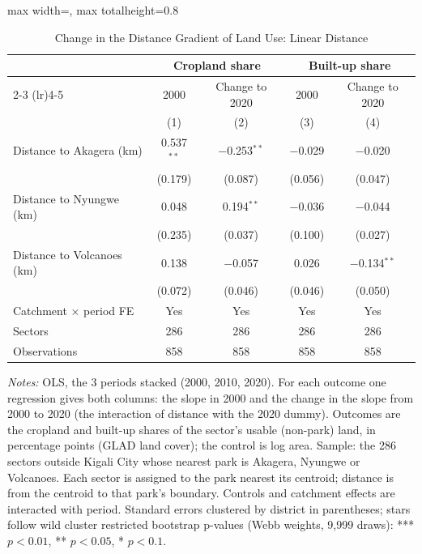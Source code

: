 \documentclass[11pt]{article}
\begin{document}
\clearpage
\begin{table}[H]
\centering\footnotesize\setlength{\tabcolsep}{4pt}
\caption{Change in the Distance Gradient of Land Use: Linear Distance}
\label{tab:mt_land_linear}
\begin{adjustbox}{max width=\textwidth, max totalheight=0.8\textheight}
\begin{tabular}{lcccc}
\toprule
 & \multicolumn{2}{c}{Cropland share} & \multicolumn{2}{c}{Built-up share} \\
\cmidrule(lr){2-3} \cmidrule(lr){4-5}
 & 2000 & Change to 2020 & 2000 & Change to 2020 \\
 & (1) & (2) & (3) & (4) \\
\midrule
Distance to Akagera (km) & 0.537$^{**}$ & $-$0.253$^{**}$ & $-$0.029 & $-$0.020 \\
 & (0.179) & (0.087) & (0.056) & (0.047) \\
Distance to Nyungwe (km) & 0.048 & 0.194$^{**}$ & $-$0.036 & $-$0.044 \\
 & (0.235) & (0.037) & (0.100) & (0.027) \\
Distance to Volcanoes (km) & 0.138 & $-$0.057 & 0.026 & $-$0.134$^{**}$ \\
 & (0.072) & (0.046) & (0.046) & (0.050) \\
\midrule
Catchment $\times$ period FE & Yes & Yes & Yes & Yes \\
Sectors & 286 & 286 & 286 & 286 \\
Observations & 858 & 858 & 858 & 858 \\
\bottomrule
\end{tabular}
\end{adjustbox}
\begin{minipage}{0.97\textwidth}\scriptsize
\textit{Notes:} OLS, the 3 periods stacked (2000, 2010, 2020). For each outcome one regression gives both columns: the slope in 2000 and the change in the slope from 2000 to 2020 (the interaction of distance with the 2020 dummy). Outcomes are the cropland and built-up shares of the sector's usable (non-park) land, in percentage points (GLAD land cover); the control is log area. Sample: the 286 sectors outside Kigali City whose nearest park is Akagera, Nyungwe or Volcanoes. Each sector is assigned to the park nearest its centroid; distance is from the centroid to that park's boundary. Controls and catchment effects are interacted with period. Standard errors clustered by district in parentheses; stars follow wild cluster restricted bootstrap p-values (Webb weights, 9,999 draws): *** $p<0.01$, ** $p<0.05$, * $p<0.1$.
\end{minipage}
\end{table}
\end{document}
